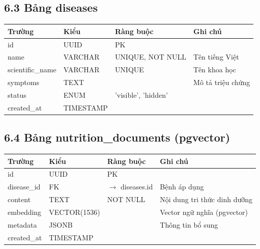 ﻿\documentclass[12pt,a4paper]{article}
\begin{document}
\subsection*{6.3 Bảng diseases}
\begin{longtable}{|p{3cm}|p{2.5cm}|p{3cm}|p{5cm}|}
\hline
\rowcolor{headerblue}
\textbf{Trường} & \textbf{Kiểu} & \textbf{Ràng buộc} & \textbf{Ghi chú} \\
\hline
id & UUID & PK & \\
\hline
name & VARCHAR & UNIQUE, NOT NULL & Tên tiếng Việt \\
\hline
scientific\_name & VARCHAR & UNIQUE & Tên khoa học \\
\hline
symptoms & TEXT & & Mô tả triệu chứng \\
\hline
status & ENUM & 'visible', 'hidden' & \\
\hline
created\_at & TIMESTAMP & & \\
\hline
\end{longtable}

\subsection*{6.4 Bảng nutrition\_documents (pgvector)}
\begin{longtable}{|p{3cm}|p{2.5cm}|p{3cm}|p{5cm}|}
\hline
\rowcolor{headerblue}
\textbf{Trường} & \textbf{Kiểu} & \textbf{Ràng buộc} & \textbf{Ghi chú} \\
\hline
id & UUID & PK & \\
\hline
disease\_id & FK & $\rightarrow$ diseases.id & Bệnh áp dụng \\
\hline
content & TEXT & NOT NULL & Nội dung tri thức dinh dưỡng \\
\hline
embedding & VECTOR(1536) & & Vector ngữ nghĩa (pgvector) \\
\hline
metadata & JSONB & & Thông tin bổ sung \\
\hline
created\_at & TIMESTAMP & & \\
\hline
\end{longtable}
\end{document}
